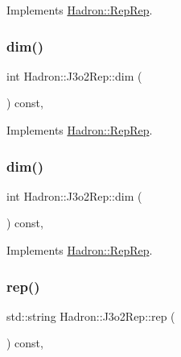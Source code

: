 Implements \mbox{\hyperlink{structHadron_1_1RepRep_a92c8802e5ed7afd7da43ccfd5b7cd92b}{Hadron\+::\+Rep\+Rep}}.

\mbox{\label{structHadron_1_1J3o2Rep_a119556341b3fb8bfb4615b3798973c9c}} 
\subsubsection{\texorpdfstring{dim()}{dim()}\hspace{0.1cm}{\footnotesize\ttfamily [4/5]}}
{\footnotesize\ttfamily int Hadron\+::\+J3o2\+Rep\+::dim (\begin{DoxyParamCaption}{ }\end{DoxyParamCaption}) const\hspace{0.3cm}{\ttfamily [inline]}, {\ttfamily [virtual]}}



Implements \mbox{\hyperlink{structHadron_1_1RepRep_a92c8802e5ed7afd7da43ccfd5b7cd92b}{Hadron\+::\+Rep\+Rep}}.

\mbox{\label{structHadron_1_1J3o2Rep_a119556341b3fb8bfb4615b3798973c9c}} 
\subsubsection{\texorpdfstring{dim()}{dim()}\hspace{0.1cm}{\footnotesize\ttfamily [5/5]}}
{\footnotesize\ttfamily int Hadron\+::\+J3o2\+Rep\+::dim (\begin{DoxyParamCaption}{ }\end{DoxyParamCaption}) const\hspace{0.3cm}{\ttfamily [inline]}, {\ttfamily [virtual]}}



Implements \mbox{\hyperlink{structHadron_1_1RepRep_a92c8802e5ed7afd7da43ccfd5b7cd92b}{Hadron\+::\+Rep\+Rep}}.

\mbox{\label{structHadron_1_1J3o2Rep_a4284616b9bdc9582f085ab1b60a15f1d}} 
\subsubsection{\texorpdfstring{rep()}{rep()}\hspace{0.1cm}{\footnotesize\ttfamily [1/5]}}
{\footnotesize\ttfamily std\+::string Hadron\+::\+J3o2\+Rep\+::rep (\begin{DoxyParamCaption}{ }\end{DoxyParamCaption}) const\hspace{0.3cm}{\ttfamily [inline]}, {\ttfamily [virtual]}}




